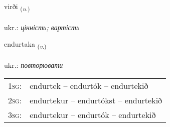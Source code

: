 \documentclass[frontgrid, backgrid]{flacards}\usepackage[]{graphicx}\usepackage[]{xcolor}
\begin{document}
\renewcommand{\flhead}{\vskip5pt \fboxsep=0pt {\small\bfseries\footnotesize Nafnorð | іменник}}
\renewcommand{\fcfoot}{\vskip5pt \fboxsep=0pt \hspace{2pt}{\small\bfseries\footnotesize 2K}}

\renewcommand{\blhead}{\vskip5pt {\small\bfseries\footnotesize Nafnorð | іменник }}
\renewcommand{\bcfoot}{\vskip5pt \hspace{2pt}{\small\bfseries\footnotesize 2K}}


{virði \small{\textsubscript{(\textit{n.})}} \\[1ex] %
\textphonetic{[vɪrðɪ]} \\
ukr.: \emph{цінність; вартість} \\  [2ex]
\renewcommand*{\arraystretch}{0.8}
}

\renewcommand{\flhead}{\vskip5pt \fboxsep=0pt {\small\bfseries\footnotesize Sagnorð | дієслово}}
\renewcommand{\fcfoot}{\vskip5pt \fboxsep=0pt \hspace{2pt}{\small\bfseries\footnotesize 2K}}

\renewcommand{\blhead}{\vskip5pt {\small\bfseries\footnotesize Sagnorð | дієслово }}
\renewcommand{\bcfoot}{\vskip5pt \hspace{2pt}{\small\bfseries\footnotesize 2K}}


{endurtaka \small{\textsubscript{(\textit{v.})}} \\[1ex] %
 \\
ukr.: \emph{повторювати} \\  [2ex]
\renewcommand*{\arraystretch}{0.8}
\begin{tabular}{p{1cm}l}
\textsc{1sg}: & endurtek -- endurtók -- endurtekið \\ 
\textsc{2sg}: & endurtekur -- endurtókst -- endurtekið \\ 
\textsc{3sg}: & endurtekur -- endurtók -- endurtekið \\ 
\end{tabular}
}
\end{document}

